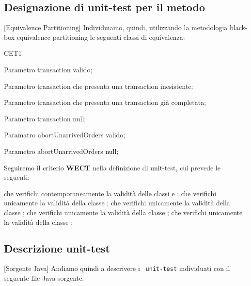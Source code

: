 \subsection{Designazione di unit-test per il metodo}[Equivalence Partitioning]
\newpage
Individuiamo, quindi, utilizzando la metodologia black-box equivalence partitioning le seguenti classi di equivalenza:
\begin{eqpart}{CET1}
	\item[CET1] Parametro transaction valido;
	\item[CET2] Parametro transaction che presenta una transaction inesistente;
	\item[CET3] Parametro transaction che presenta una transaction già completata;
	\item[CET4] Parametro transaction null;
	\item[CEA1] Paramatro abortUnarrivedOrders valido;
	\item[CEA2] Parametro abortUnarrivedOrders null;
\end{eqpart}

Seguiremo il criterio \textbf{WECT} nella definizione di unit-test, cui prevede le seguenti:
\begin{eqtest}
	 che verifichi contemporaneamente la validità delle classi  e ;
	 che verifichi unicamente la validità della classe ;
	 che verifichi unicamente la validità della classe ;
	 che verifichi unicamente la validità della classe ;
	 che verifichi unicamente la validità della classe ;
\end{eqtest}

\newpage
\subsection{Descrizione unit-test}[Sorgente Java]
Andiamo quindi a descrivere i \texttt{\color{ddchaptercolor!80!black}\theenumi\ unit-test} individuati
con il seguente file Java sorgente.

